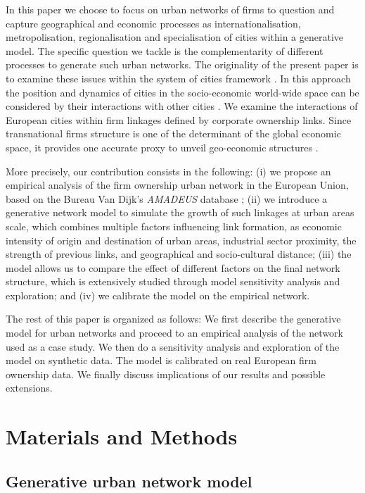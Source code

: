 \documentclass[10pt,letterpaper]{article}
\begin{document}
In this paper we choose to focus on urban networks of firms to question and capture geographical and economic processes as internationalisation, metropolisation, regionalisation and specialisation of cities within a generative model. The specific question we tackle is the complementarity of different processes to generate such urban networks. The originality of the present paper is to examine these issues within the system of cities framework \cite{berry1964cities}. In this approach the position and dynamics of cities in the socio-economic world-wide space can be considered by their interactions with other cities \cite{pumain2018evolutionary}. We examine the interactions of European cities within firm linkages defined by corporate ownership links. Since transnational firms structure is one of the determinant of the global economic space, it provides one accurate proxy to unveil geo-economic structures \cite{2019arXiv191014652Z}. 

More precisely, our contribution consists in the following: (i) we propose an empirical analysis of the firm ownership urban network in the European Union, based on the Bureau Van Dijk's \emph {AMADEUS} database \cite{AMADEUS2018}; (ii) we introduce a generative network model to simulate the growth of such linkages at urban areas scale, which combines multiple factors influencing link formation, as economic intensity of origin and destination of urban areas, industrial sector proximity, the strength of previous links, and geographical and socio-cultural distance; (iii) the model allows us to compare the effect of different factors on the final network structure, which is extensively studied through model sensitivity analysis and exploration; and (iv) we calibrate the model on the empirical network.


The rest of this paper is organized as follows: We first describe the generative model for urban networks and proceed to an empirical analysis of the network used as a case study. We then do a sensitivity analysis and exploration of the model on synthetic data. The model is calibrated on real European firm ownership data. We finally discuss implications of our results and possible extensions.

\section*{Materials and Methods}

\subsection*{Generative urban network model}
\end{document}
